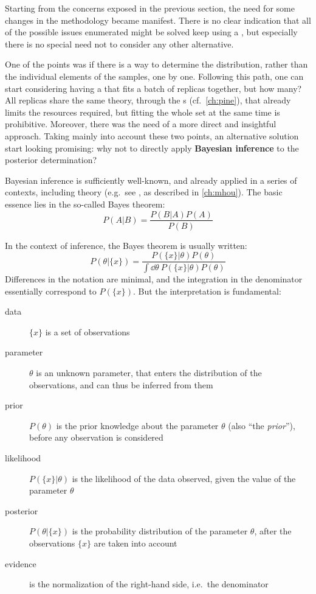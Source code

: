 
Starting from the concerns exposed in the previous section, the need for some
changes in the methodology became manifest.
%
There is no clear indication that all of the possible issues enumerated might
be solved keep using a \nn, but especially there is no special need not to
consider any other alternative.

One of the points was if there is a way to determine the distribution, rather
than the individual elements of the samples, one by one.
%
Following this path, one can start considering having a \nn that fits a batch
of replicas together, but how many?
%
All replicas share the same theory, through the \fktab{}s (cf.\
\cref{ch:pine}), that already limits the resources required, but fitting the
whole set at the same time is prohibitive.
%
Moreover, there was the need of a more direct and insightful approach.
%
Taking mainly into account these two points, an alternative solution start
looking promising: why not to directly apply \textbf{Bayesian inference} to the
\pdf posterior determination?

Bayesian inference is sufficiently well-known, and already applied in a series
of contexts, including \hep theory (e.g.\ see \cite{Cacciari:2011ze}, as
described in \cref{ch:mhou}).
%
The basic essence lies in the so-called Bayes theorem:
\begin{equation}
  P(A|B) = \frac{P(B|A) P(A)}{P(B)}
  \label{eq:gp/bayes}
\end{equation}

In the context of inference, the Bayes theorem is usually written:
\begin{equation}
  P\left(\theta|\{x\}\right) = \frac{P\left(\{x\}|\theta\right) P\left(\theta\right)}{
    \int \dd\theta~ P\left(\{x\}|\theta\right) P\left(\theta\right)
  }
  \label{eq:gp/bayes-inf}
\end{equation}
Differences in the notation are minimal, and the integration in the denominator
essentially correspond to $P(\{x\})$.
%
But the interpretation is fundamental:
\begin{description}
  \item[data] $\{x\}$ is a set of observations
  \item[parameter] $\theta$ is an unknown parameter, that enters the
    distribution of the observations, and can thus be inferred from them
  \item[prior] $P(\theta)$ is the prior knowledge about the parameter $\theta$
    (also \enquote{the \textit{prior}}), before any observation is considered
  \item[likelihood] $P\left(\{x\}|\theta\right)$ is the likelihood of the data
    observed, given the value of the parameter $\theta$
  \item[posterior] $P\left(\theta|\{x\}\right)$ is the probability distribution
    of the parameter $\theta$, after the observations $\{x\}$ are taken into
    account
  \item[evidence] is the normalization of the right-hand side, i.e.\ the
    denominator
\end{description}

